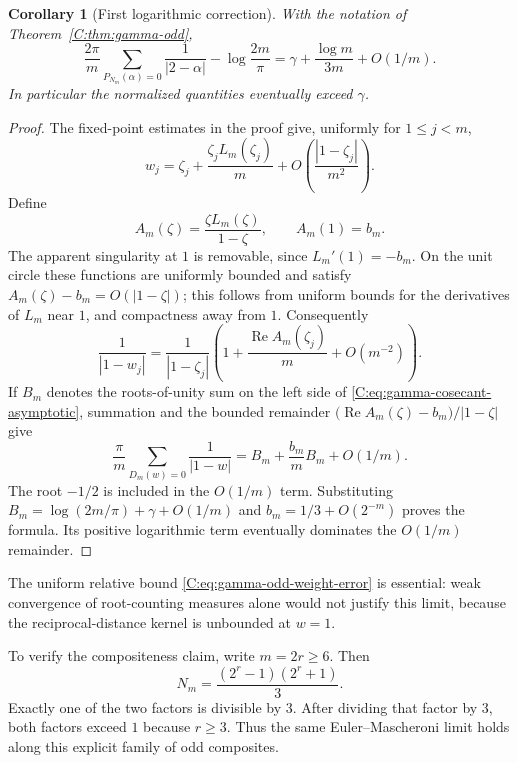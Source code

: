 \documentclass[11pt,a4paper]{article}
\newtheorem{corollary}[theorem]{Corollary}
\theoremstyle{definition}
\theoremstyle{remark}
\numberwithin{equation}{section}
\begin{document}
\begin{corollary}[First logarithmic correction]
With the notation of Theorem~\ref{C:thm:gamma-odd},
\[
 \frac{2\pi}{m}\sum_{P_{N_m}(\alpha)=0}\frac1{|2-\alpha|}
 -\log\frac{2m}{\pi}
 =\gamma+\frac{\log m}{3m}+O(1/m).
\]
In particular the normalized quantities eventually exceed $\gamma$.
\end{corollary}
\begin{proof}
The fixed-point estimates in the proof give, uniformly for $1\le j<m$,
\[
 w_j=\zeta_j+\frac{\zeta_jL_m(\zeta_j)}m
           +O\!\left(\frac{|1-\zeta_j|}{m^2}\right).
\]
Define
\[
 A_m(\zeta)=\frac{\zeta L_m(\zeta)}{1-\zeta},\qquad A_m(1)=b_m.
\]
The apparent singularity at $1$ is removable, since $L_m'(1)=-b_m$.
On the unit circle these functions are uniformly bounded and satisfy
$A_m(\zeta)-b_m=O(|1-\zeta|)$; this follows from uniform bounds for
the derivatives of $L_m$ near $1$, and compactness away from $1$.
Consequently
\[
 \frac1{|1-w_j|}
 =\frac1{|1-\zeta_j|}
   \left(1+\frac{\operatorname{Re}A_m(\zeta_j)}m+O(m^{-2})\right).
\]
If $B_m$ denotes the roots-of-unity sum on the left side of
\eqref{C:eq:gamma-cosecant-asymptotic}, summation and the bounded remainder
$\bigl(\operatorname{Re}A_m(\zeta)-b_m\bigr)/|1-\zeta|$ give
\[
 \frac\pi m\sum_{D_m(w)=0}\frac1{|1-w|}
 =B_m+\frac{b_m}{m}B_m+O(1/m).
\]
The root $-1/2$ is included in the $O(1/m)$ term. Substituting
$B_m=\log(2m/\pi)+\gamma+O(1/m)$ and
$b_m=1/3+O(2^{-m})$ proves the formula. Its positive logarithmic term
eventually dominates the $O(1/m)$ remainder.
\end{proof}

The uniform relative bound \eqref{C:eq:gamma-odd-weight-error} is essential:
weak convergence of root-counting measures alone would not justify this
limit, because the reciprocal-distance kernel is unbounded at $w=1$.

To verify the compositeness claim, write $m=2r\ge6$. Then
\[
 N_m=\frac{(2^r-1)(2^r+1)}3.
\]
Exactly one of the two factors is divisible by $3$. After dividing that
factor by $3$, both factors exceed $1$ because $r\ge3$. Thus the same
Euler--Mascheroni limit holds along this explicit family of odd composites.
\end{document}
